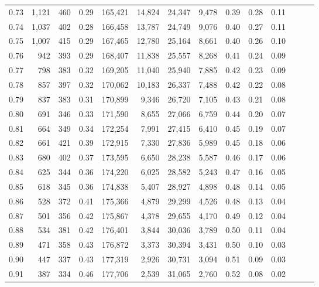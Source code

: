 \begin{tabular}{rrrrrrrrrrrrrr}
0.73 &  1,121 &  460 &  0.29 &  165,421 &   14,824 &  24,347 &   9,478 &  0.39 &  0.28 &      0.11 \\
0.74 &  1,037 &  402 &  0.28 &  166,458 &   13,787 &  24,749 &   9,076 &  0.40 &  0.27 &      0.11 \\
0.75 &  1,007 &  415 &  0.29 &  167,465 &   12,780 &  25,164 &   8,661 &  0.40 &  0.26 &      0.10 \\
0.76 &    942 &  393 &  0.29 &  168,407 &   11,838 &  25,557 &   8,268 &  0.41 &  0.24 &      0.09 \\
0.77 &    798 &  383 &  0.32 &  169,205 &   11,040 &  25,940 &   7,885 &  0.42 &  0.23 &      0.09 \\
0.78 &    857 &  397 &  0.32 &  170,062 &   10,183 &  26,337 &   7,488 &  0.42 &  0.22 &      0.08 \\
0.79 &    837 &  383 &  0.31 &  170,899 &    9,346 &  26,720 &   7,105 &  0.43 &  0.21 &      0.08 \\
0.80 &    691 &  346 &  0.33 &  171,590 &    8,655 &  27,066 &   6,759 &  0.44 &  0.20 &      0.07 \\
0.81 &    664 &  349 &  0.34 &  172,254 &    7,991 &  27,415 &   6,410 &  0.45 &  0.19 &      0.07 \\
0.82 &    661 &  421 &  0.39 &  172,915 &    7,330 &  27,836 &   5,989 &  0.45 &  0.18 &      0.06 \\
0.83 &    680 &  402 &  0.37 &  173,595 &    6,650 &  28,238 &   5,587 &  0.46 &  0.17 &      0.06 \\
0.84 &    625 &  344 &  0.36 &  174,220 &    6,025 &  28,582 &   5,243 &  0.47 &  0.16 &      0.05 \\
0.85 &    618 &  345 &  0.36 &  174,838 &    5,407 &  28,927 &   4,898 &  0.48 &  0.14 &      0.05 \\
0.86 &    528 &  372 &  0.41 &  175,366 &    4,879 &  29,299 &   4,526 &  0.48 &  0.13 &      0.04 \\
0.87 &    501 &  356 &  0.42 &  175,867 &    4,378 &  29,655 &   4,170 &  0.49 &  0.12 &      0.04 \\
0.88 &    534 &  381 &  0.42 &  176,401 &    3,844 &  30,036 &   3,789 &  0.50 &  0.11 &      0.04 \\
0.89 &    471 &  358 &  0.43 &  176,872 &    3,373 &  30,394 &   3,431 &  0.50 &  0.10 &      0.03 \\
0.90 &    447 &  337 &  0.43 &  177,319 &    2,926 &  30,731 &   3,094 &  0.51 &  0.09 &      0.03 \\
0.91 &    387 &  334 &  0.46 &  177,706 &    2,539 &  31,065 &   2,760 &  0.52 &  0.08 &      0.02 \\

\end{tabular}
